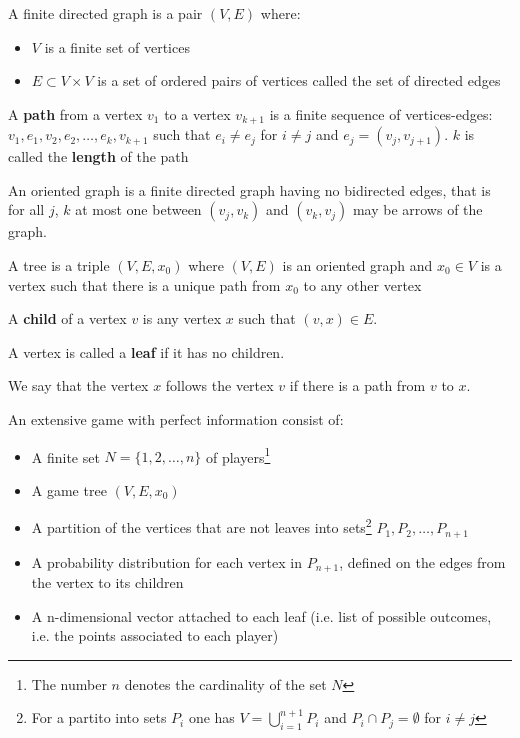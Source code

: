 \documentclass[../main.tex]{subfiles}
\begin{document}
\begin{definition}
    A finite directed graph is a pair $(V, E)$ where:
    \begin{itemize}
        \item $V$ is a finite set of vertices
        \item $E \subset V \times V$ is a set of ordered pairs of vertices called the set of directed edges
    \end{itemize}
\end{definition}
\begin{definition}
    A \textbf{path} from a vertex $v_1$ to a vertex $v_{k+1}$ is a finite sequence of vertices-edges: $v_1, e_1, v_2, e_2, \ldots, e_k, v_{k+1}$ such that $e_i \neq e_j$ for $i \neq j$ and $e_j = (v_j, v_{j+1})$. $k$ is called the \textbf{length} of the path
\end{definition}
\begin{definition}
    An oriented graph is a finite directed graph having no bidirected edges, that is for all $j$, $k$ at most one between $(v_j , v_k)$ and $(v_k , v_j)$ may be arrows of the graph.
\end{definition}
\begin{definition}[Tree]
    A tree is a triple $(V, E, x_0)$ where $(V, E)$ is an oriented graph and $x_0 \in V$ is a vertex such that there is a unique path from $x_0$ to any other vertex
\end{definition}
\begin{definition}
    A \textbf{child} of a vertex $v$ is any vertex $x$ such that $(v, x) \in E$.

    A vertex is called a \textbf{leaf} if it has no children.

    We say that the vertex $x$ follows the vertex $v$ if there is a path from $v$ to $x$.
\end{definition}

\newpage %

\begin{definition}
    An extensive game with perfect information consist of:
    \begin{itemize}
        \item A finite set $N=\{1,2,\ldots,n\}$ of players\footnote{The number $n$ denotes the cardinality of the set $N$}
        \item A game tree $(V, E, x_0)$
        \item A partition of the vertices that are not leaves into sets\footnote{For a partito into sets $P_i$ one has $V=\bigcup_{i=1}^{n+1} P_i$ and $P_i \cap P_j = \emptyset$ for $i \neq j$} ${P_1, P_2, \ldots, P_{n+1}}$
        \item A probability distribution for each vertex in $P_{n+1}$, defined on the edges from the vertex to its children
        \item A n-dimensional vector attached to each leaf (i.e. list of possible outcomes, i.e. the points associated to each player)
    \end{itemize}
\end{definition}
\end{document}
